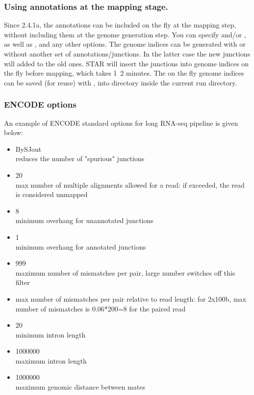 \documentclass[12pt]{article}
\begin{document}
\subsubsection{Using annotations at the mapping stage.}
Since 2.4.1a, the annotations can  be included on the fly at the mapping step, without including them at the genome generation step. You can specify   and/or  , as well as , and any other  options. The genome indices can be generated with or  without another set of annotations/junctions. In the latter case the new junctions will added to the old ones. STAR will insert the junctions into genome indices on the fly before mapping, which takes 1~2 minutes. The on the fly genome indices can be saved (for reuse) with  , into  directory inside the current run directory.

\subsubsection{ENCODE options}
An example of ENCODE standard options for long RNA-seq pipeline is given below:
\begin{itemize}
\item[]
              BySJout\\
reduces the number of "spurious" junctions
\item[] 
      20\\
max number of multiple alignments allowed for a read: if exceeded, the read is considered unmapped
\item[]
         8\\
minimum overhang for unannotated junctions
\item[]
       1\\
minimum overhang for annotated junctions
\item[]
      999\\
maximum number of mismatches per pair, large number switches off this filter
\item[]
max number of mismatches per pair relative to read length: for 2x100b, max number of mismatches is 0.06*200=8 for the paired read
\item[]
             20\\
minimum intron length
\item[]
             1000000\\
maximum intron length
\item[]
           1000000\\
maximum genomic distance between mates
\end{itemize}
\end{document}
